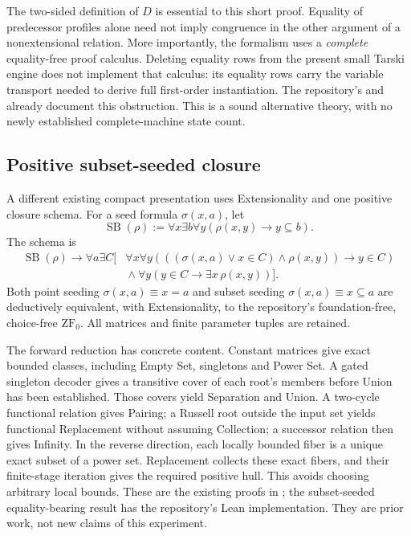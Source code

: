 The two-sided definition of $D$ is essential to this short proof.
Equality of predecessor profiles alone need not imply congruence
in the other argument of a nonextensional relation.  More importantly,
the formalism uses a \emph{complete} equality-free proof calculus.
Deleting equality rows from the present small Tarski engine does
not implement that calculus: its equality rows carry the variable
transport needed to derive full first-order instantiation.  The
repository's  and
 already document this obstruction.
This is a sound alternative theory, with no newly established
complete-machine state count.

\subsection{Positive subset-seeded closure}

A different existing compact presentation uses Extensionality and
one positive closure schema.  For a seed formula $\sigma(x,a)$,
let
\[
\operatorname{SB}(\rho):=
 \forall x\exists b\forall y(\rho(x,y)\to y\subseteq b).
\]
The schema is
\[
\begin{split}
\operatorname{SB}(\rho)\to\forall a\exists C[{}&
\forall x\forall y(((\sigma(x,a)\lor x\in C)\land\rho(x,y))
                     \to y\in C)\\
&{}\land\forall y(y\in C\to\exists x\,\rho(x,y))].
\end{split}
\]
Both point seeding $\sigma(x,a)\equiv x=a$ and subset seeding
$\sigma(x,a)\equiv x\subseteq a$ are deductively equivalent,
with Extensionality, to the repository's foundation-free,
choice-free $\mathrm{ZF}_0$.  All matrices and finite parameter
tuples are retained.

The forward reduction has concrete content.  Constant matrices
give exact bounded classes, including Empty Set, singletons and
Power Set.  A gated singleton decoder gives a transitive cover of
each root's members before Union has been established.  Those
covers yield Separation and Union.  A two-cycle functional relation
gives Pairing; a Russell root outside the input set yields functional
Replacement without assuming Collection; a successor relation
then gives Infinity.  In the reverse direction, each locally bounded
fiber is a unique exact subset of a power set.  Replacement collects
these exact fibers, and their finite-stage iteration gives the
required positive hull.  This avoids choosing arbitrary local bounds.
These are the existing proofs in ; the
subset-seeded equality-bearing result has the repository's Lean
 implementation.  They are prior work,
not new claims of this experiment.

